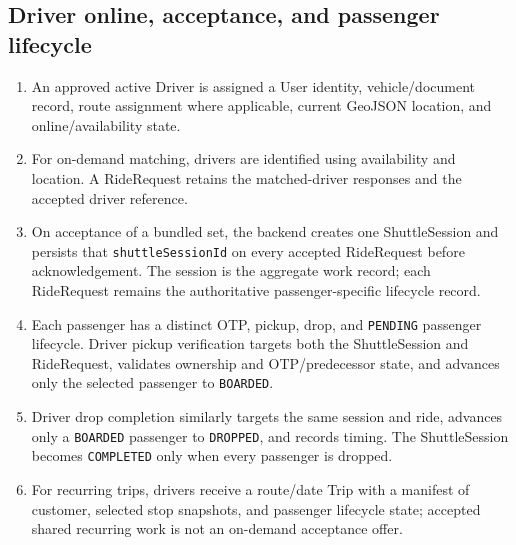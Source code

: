 \documentclass[11pt,a4paper]{article}
\newcommand{\code}[1]{\texttt{#1}}
\begin{document}
\subsection{Driver online, acceptance, and passenger lifecycle}
\begin{enumerate}
  \item An approved active Driver is assigned a User identity, vehicle/document record, route assignment where applicable, current GeoJSON location, and online/availability state.
  \item For on-demand matching, drivers are identified using availability and location. A RideRequest retains the matched-driver responses and the accepted driver reference.
  \item On acceptance of a bundled set, the backend creates one ShuttleSession and persists that \code{shuttleSessionId} on every accepted RideRequest before acknowledgement. The session is the aggregate work record; each RideRequest remains the authoritative passenger-specific lifecycle record.
  \item Each passenger has a distinct OTP, pickup, drop, and \code{PENDING} passenger lifecycle. Driver pickup verification targets both the ShuttleSession and RideRequest, validates ownership and OTP/predecessor state, and advances only the selected passenger to \code{BOARDED}.
  \item Driver drop completion similarly targets the same session and ride, advances only a \code{BOARDED} passenger to \code{DROPPED}, and records timing. The ShuttleSession becomes \code{COMPLETED} only when every passenger is dropped.
  \item For recurring trips, drivers receive a route/date Trip with a manifest of customer, selected stop snapshots, and passenger lifecycle state; accepted shared recurring work is not an on-demand acceptance offer.
\end{enumerate}
\end{document}
